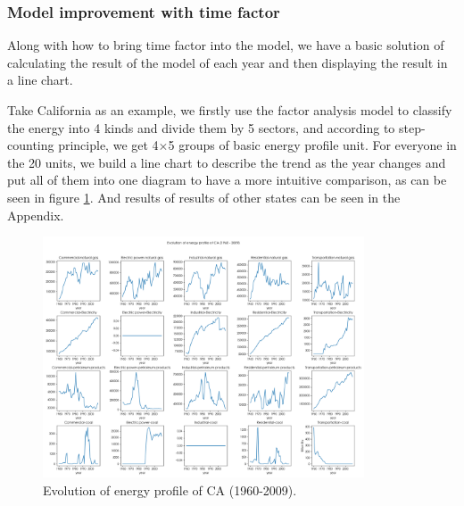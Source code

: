 \documentclass[a4paper,11pt]{article}
\begin{document}
\subsubsection{Model improvement with time factor}
\par Along with how to bring time factor into the model, we have a basic solution of calculating the result of the model of each year and then displaying the result in a line chart. 

\par Take California as an example, we firstly use the factor analysis model to classify the energy into 4 kinds and divide them by 5 sectors, and according to step-counting principle, we get 4$\times$5 groups of basic energy profile unit. For everyone in the 20 units, we build a line chart to describe the trend as the year changes and put all of them into one diagram to have a more intuitive comparison, as can be seen in figure \ref{fig:part-2-CA}. And results of results of other states can be seen in the Appendix. %

\begin{figure}[H]%
    \centering 
    \includegraphics[width=0.85\textwidth]{./Pic/B-classify-CA.png}
    \caption{Evolution of energy profile of CA (1960-2009).}
    \label{fig:part-2-CA}  
\end{figure}

\end{document}
